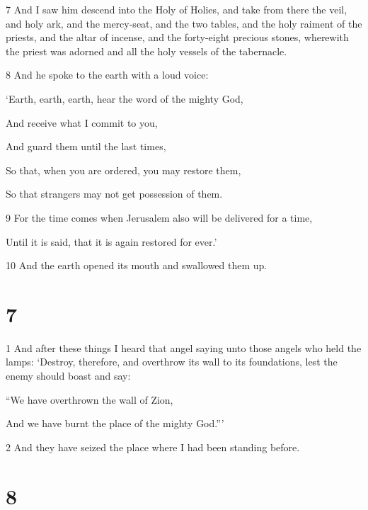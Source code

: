 \par 7 And I saw him descend into the Holy of Holies, and take from there the veil, and holy ark, and the mercy-seat, and the two tables, and the holy raiment of the priests, and the altar of incense, and the forty-eight precious stones, wherewith the priest was adorned and all the holy vessels of the tabernacle. 

\par 8 And he spoke to the earth with a loud voice:

\par ‘Earth, earth, earth, hear the word of the mighty God,

\par And receive what I commit to you,

\par And guard them until the last times,

\par So that, when you are ordered, you may restore them,

\par So that strangers may not get possession of them.

\par 9 For the time comes when Jerusalem also will be delivered for a time,

\par Until it is said, that it is again restored for ever.’

\par 10 And the earth opened its mouth and swallowed them up.

\chapter{7}

\par 1 And after these things I heard that angel saying unto those angels who held the lamps: ‘Destroy, therefore, and overthrow its wall to its foundations, lest the enemy should boast and say:

\par “We have overthrown the wall of Zion,

\par And we have burnt the place of the mighty God.”’

\par 2 And they have seized the place where I had been standing before.

\chapter{8}

